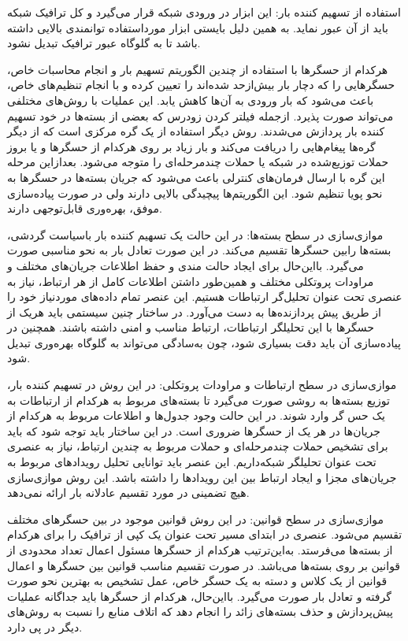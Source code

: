 \documentclass[a4paper,oneside,12pt]{report}
\begin{document}
استفاده از تسهیم کننده بار: این ابزار در ورودی شبکه قرار می‌گیرد و کل ترافیک شبکه باید از آن عبور نماید. به همین دلیل بایستی ابزار مورداستفاده توانمندی بالایی داشته باشد تا به گلوگاه عبور ترافیک تبدیل نشود.

 هرکدام از حسگرها با استفاده از چندین الگوریتم تسهیم بار و انجام محاسبات خاص، حسگرهایی را که دچار بار بیش‌ازحد شده‌اند را تعیین کرده و با انجام تنظیم‌های خاص، باعث می‌شود که بار ورودی به آن‌ها کاهش یابد. این عملیات با روش‌های مختلفی می‌تواند صورت پذیرد. ازجمله فیلتر کردن زودرس که بعضی از بسته‌ها در خود تسهیم کننده بار پردازش می‌شدند. روش دیگر استفاده از یک گره مرکزی است که از دیگر گره‌ها پیغام‌هایی را دریافت می‌کند و بار زیاد بر روی هرکدام از حسگرها و یا بروز حملات توزیع‌شده در شبکه یا حملات چندمرحله‌ای را متوجه می‌شود. بعدازاین مرحله این گره با ارسال فرمان‌های کنترلی باعث می‌شود که جریان بسته‌ها در حسگرها به نحو پویا تنظیم شود. این الگوریتم‌ها پیچیدگی بالایی دارند ولی در صورت پیاده‌سازی موفق، بهره‌وری قابل‌توجهی دارند.
 
موازی‌سازی در سطح بسته‌ها: در این حالت یک تسهیم کننده بار باسیاست گردشی، بسته‌ها رابین حسگرها تقسیم می‌کند. در این صورت تعادل بار به نحو مناسبی صورت می‌گیرد. بااین‌حال برای ایجاد حالت مندی و حفظ اطلاعات جریان‌های مختلف و مراودات پروتکلی مختلف و همین‌طور داشتن اطلاعات کامل از هر ارتباط، نیاز به عنصری تحت عنوان تحلیل‌گر ارتباطات هستیم. این عنصر تمام داده‌های موردنیاز خود را از طریق پیش پردازنده‌ها به دست می‌آورد. در ساختار چنین سیستمی باید هریک از حسگرها با این تحلیلگر ارتباطات، ارتباط مناسب و امنی داشته باشند. همچنین در پیاده‌سازی آن باید دقت بسیاری شود، چون به‌سادگی می‌تواند به گلوگاه بهره‌وری تبدیل شود.

موازی‌سازی در سطح ارتباطات و مراودات پروتکلی: در این روش در تسهیم کننده بار، توزیع بسته‌ها به روشی صورت می‌گیرد تا بسته‌های مربوط به هرکدام از ارتباطات به یک حس گر وارد شوند. در این حالت وجود جدول‌ها و اطلاعات مربوط به هرکدام از جریان‌ها در هر یک از حسگرها ضروری است. در این ساختار باید توجه شود که باید برای تشخیص حملات چندمرحله‌ای و حملات مربوط به چندین ارتباط، نیاز به عنصری تحت عنوان تحلیلگر شبکه‌داریم. این عنصر باید توانایی تحلیل رویدادهای مربوط به جریان‌های مجزا و ایجاد ارتباط بین این رویدادها را داشته باشد. این روش موازی‌سازی هیچ تضمینی در مورد تقسیم عادلانه بار ارائه نمی‌دهد.

موازی‌سازی در سطح قوانين: در این روش قوانین موجود در 
بین حسگرهای مختلف تقسیم می‌شود. عنصری در ابتدای مسیر تحت عنوان 
یک کپی از ترافیک را برای هرکدام از بسته‌ها می‌فرستد. به‌این‌ترتیب هرکدام از حسگرها مسئول اعمال تعداد محدودی از قوانین بر روی بسته‌ها می‌باشد. در صورت تقسیم مناسب قوانین بین حسگرها و اعمال قوانین از یک کلاس و دسته به یک حسگر خاص، عمل تشخیص به بهترین نحو صورت گرفته و تعادل بار صورت می‌گیرد. بااین‌حال، هرکدام از حسگرها باید جداگانه عملیات پیش‌پردازش و حذف بسته‌های زائد را انجام دهد که اتلاف منابع را نسبت به روش‌های دیگر در پی دارد.
\end{document}
